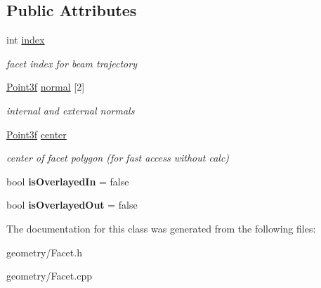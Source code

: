 \subsection*{Public Attributes}
\begin{DoxyCompactItemize}
\item 
\mbox{\label{class_facet_a082f85a877b24031f8f5d8ffb6ee2a19}} 
int \mbox{\hyperlink{class_facet_a082f85a877b24031f8f5d8ffb6ee2a19}{index}}
\begin{DoxyCompactList}\small\item\em facet index for beam trajectory \end{DoxyCompactList}\item 
\mbox{\label{class_facet_a6ce44c6c8de9cd91b4f0d49954871fd0}} 
\mbox{\hyperlink{struct_point3f}{Point3f}} \mbox{\hyperlink{class_facet_a6ce44c6c8de9cd91b4f0d49954871fd0}{normal}} \mbox{[}2\mbox{]}
\begin{DoxyCompactList}\small\item\em internal and external normals \end{DoxyCompactList}\item 
\mbox{\label{class_facet_a6b4c24cba4807b8e4b36663d104d0916}} 
\mbox{\hyperlink{struct_point3f}{Point3f}} \mbox{\hyperlink{class_facet_a6b4c24cba4807b8e4b36663d104d0916}{center}}
\begin{DoxyCompactList}\small\item\em center of facet polygon (for fast access without calc) \end{DoxyCompactList}\item 
\mbox{\label{class_facet_a1a7b54c5a6f7b251acec1fe0cc502baa}} 
bool {\bfseries is\+Overlayed\+In} = false
\item 
\mbox{\label{class_facet_a04433996dfd634bf0c9d5b6a6c196ec9}} 
bool {\bfseries is\+Overlayed\+Out} = false
\end{DoxyCompactItemize}


The documentation for this class was generated from the following files\+:\begin{DoxyCompactItemize}
\item 
geometry/Facet.\+h\item 
geometry/Facet.\+cpp\end{DoxyCompactItemize}

